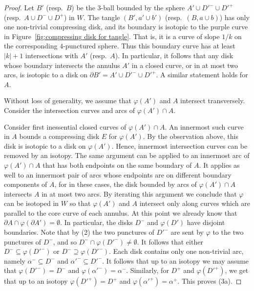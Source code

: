\documentclass[12pt,reqno]{amsart}
\theoremstyle{plain}
\theoremstyle{definition}
\begin{document}
\begin{proof}
Let $B'$ (resp.\ $B$) be the 3-ball bounded by the sphere $A' \cup D'^-\cup D'^+$  
(resp.\ $A \cup D^-\cup D^+$) in $W$. The tangle $(B', a'\cup b')$ 
(resp.\ $(B,a\cup b)$)  has only one non-trivial compressing disk, and 
its boundary is isotopic to the purple curve in
Figure~\ref{fig:compressing disk for tangle}. 
That is, it is a curve of slope $1/k$ on the corresponding $4$-punctured sphere. 
Thus this boundary curve has at least $|k|+1$ intersections with $A'$ (resp.\ $A$). 
In particular, it follows that any disk whose boundary intersects the 
annulus $A'$ in a closed curve, or in at most two arcs, is isotopic to 
a disk on $\partial B'=A' \cup D'^-\cup D'^+$. 
A similar statement holds for $A$. 

Without loss of generality,  we assume that $\varphi(A')$ and $A$ intersect 
transversely. Consider the intersection curves and arcs of $\varphi(A') \cap A$. 

Consider first inessential closed curves of $\varphi(A') \cap A$. An innermost 
such curve in $A$ bounds a compressing disk $E$ for $\varphi(A')$. By the
observation above, this disk is isotopic to a disk on $\varphi(A')$. Hence, 
innermost intersection curves can be removed by an isotopy.
The same argument can be applied to an innermost arc of $\varphi(A') \cap A$ 
that has both endpoints on the same boundary of $A$. It applies as well 
to an innermost pair of arcs whose endpoints are on different boundary 
components of $A$, for in these cases, the disk bounded by arcs of 
$\varphi(A')\cap A$ intersects $A$ in at most two arcs. 
By iterating this argument we conclude that $\varphi$ can be isotoped in $W$ so 
that $\varphi(A')$ and $A$ intersect only along curves which are parallel to 
the core curve of each annulus. At this point we already know that 
$\partial A \cap \varphi(\partial A')=\emptyset $. In particular, the disks 
$D^-$ and $\varphi(D')$ have disjoint boundaries. Note that by (2) the two 
punctures of $D'^-$ are sent by $\varphi$ to the two punctures of $D^-$, 
and so $D^-\cap \varphi(D'^-)\ne \emptyset $. It follows that either 
$D^- \subseteq \varphi(D'^-)$ or $D^- \supseteq \varphi(D'^-)$. 
Each disk contains only one non-trivial arc, namely $\alpha^- \subseteq D^-$ 
and $\alpha'^- \subseteq D'^-$. It follows that up to an isotopy we may 
assume that $\varphi(D'^-)=D^-$ and $\varphi(\alpha'^-) = \alpha^-$. 
Similarly, for $D^+$ and $\varphi(D'^+)$, we get that up to an isotopy 
$\varphi(D'^+) = D^+$ and $\varphi(\alpha'^+) = \alpha^+$. This proves (3a).


\end{proof}
\end{document}
